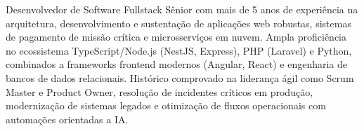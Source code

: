 

\begin{cvparagraph}
Desenvolvedor de Software Fullstack Sênior com mais de 5 anos de experiência na arquitetura, desenvolvimento e sustentação de aplicações web robustas, sistemas de pagamento de missão crítica e microsserviços em nuvem. Ampla proficiência no ecossistema TypeScript/Node.js (NestJS, Express), PHP (Laravel) e Python, combinados a frameworks frontend modernos (Angular, React) e engenharia de bancos de dados relacionais. Histórico comprovado na liderança ágil como Scrum Master e Product Owner, resolução de incidentes críticos em produção, modernização de sistemas legados e otimização de fluxos operacionais com automações orientadas a IA.
\end{cvparagraph}
